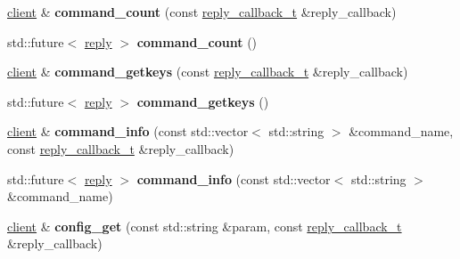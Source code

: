 \begin{DoxyCompactItemize}
\hyperlink{classcpp__redis_1_1client}{client} \& {\bfseries command\+\_\+count} (const \hyperlink{classcpp__redis_1_1client_a061a1140d36d2eaeda82b09a0bb3f9f2}{reply\+\_\+callback\+\_\+t} \&reply\+\_\+callback)
\item 
\mbox{\label{classcpp__redis_1_1client_af0cac37a62edbd7d699b379551f1ef9a}} 
std\+::future$<$ \hyperlink{classcpp__redis_1_1reply}{reply} $>$ {\bfseries command\+\_\+count} ()
\item 
\mbox{\label{classcpp__redis_1_1client_a3d23ff98ee82a404373d75b660720926}} 
\hyperlink{classcpp__redis_1_1client}{client} \& {\bfseries command\+\_\+getkeys} (const \hyperlink{classcpp__redis_1_1client_a061a1140d36d2eaeda82b09a0bb3f9f2}{reply\+\_\+callback\+\_\+t} \&reply\+\_\+callback)
\item 
\mbox{\label{classcpp__redis_1_1client_a18ab313316e99ab0a690540f40de80e3}} 
std\+::future$<$ \hyperlink{classcpp__redis_1_1reply}{reply} $>$ {\bfseries command\+\_\+getkeys} ()
\item 
\mbox{\label{classcpp__redis_1_1client_a95105c556aa5c070819bc82729d336c5}} 
\hyperlink{classcpp__redis_1_1client}{client} \& {\bfseries command\+\_\+info} (const std\+::vector$<$ std\+::string $>$ \&command\+\_\+name, const \hyperlink{classcpp__redis_1_1client_a061a1140d36d2eaeda82b09a0bb3f9f2}{reply\+\_\+callback\+\_\+t} \&reply\+\_\+callback)
\item 
\mbox{\label{classcpp__redis_1_1client_abd02a4d296ed0c160e935cd176862334}} 
std\+::future$<$ \hyperlink{classcpp__redis_1_1reply}{reply} $>$ {\bfseries command\+\_\+info} (const std\+::vector$<$ std\+::string $>$ \&command\+\_\+name)
\item 
\mbox{\label{classcpp__redis_1_1client_a510ede75cc6361f33a4cdd0695f7543f}} 
\hyperlink{classcpp__redis_1_1client}{client} \& {\bfseries config\+\_\+get} (const std\+::string \&param, const \hyperlink{classcpp__redis_1_1client_a061a1140d36d2eaeda82b09a0bb3f9f2}{reply\+\_\+callback\+\_\+t} \&reply\+\_\+callback)
\item 
\mbox{\label{classcpp__redis_1_1client_a221b1e414a4b1bb4eb2a7afaac0eb39d}} 

\end{DoxyCompactItemize}
